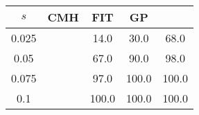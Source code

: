 \centering \begin{tabular}{c|c|c|c|c}
$s$	&CMH	&FIT	&GP	&\sc{Clear}\\\hline
0.025	&	&14.0	&30.0	&68.0\\
0.05	&	&67.0	&90.0	&98.0\\
0.075	&	&97.0	&100.0	&100.0\\
0.1	&	&100.0	&100.0	&100.0\\
\end{tabular}
